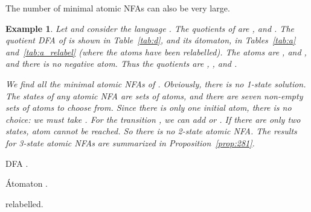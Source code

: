 \documentclass[preprint,12pt]{elsarticle}
\newcommand{\qedb}{\hfill}
\newtheorem{example}{Example}
\begin{document}
The number of minimal atomic NFAs can also be very large. 
\begin{example}
\label{ex:atomicminimal}
Let  and consider the language .
The quotients of  are ,  and .
The quotient DFA of  is shown in Table~\ref{tab:d}, and its \'atomaton, in Tables~\ref{tab:a} and~\ref{tab:a_relabel} (where the atoms have been relabelled). 
The atoms  are ,  and , and there is no negative atom.
Thus the quotients are , , and .

We find all the minimal atomic NFAs of .
Obviously, there is no 1-state solution.
The states of any atomic NFA are sets of atoms, and 
there are seven non-empty sets of atoms to choose from. 
Since there is only one initial atom, there is no choice: we must take .
For the transition , we can add  or . 
If there are only two states, atom  cannot be reached. So there is no  2-state atomic NFA.
The results for 3-state atomic NFAs  are summarized in Proposition~\ref{prop:281}. 
\qedb
\end{example}


\begin{table}[hbt]
\begin{minipage}[b]{0.2\linewidth}
\caption{DFA .}
\label{tab:d}
{\footnotesize
\begin{center}

\end{center}}
\end{minipage}
\hspace{1cm}
\begin{minipage}[b]{0.32\linewidth}
\caption{\'Atomaton .}
\label{tab:a}
{\footnotesize
\begin{center}

\end{center}}
\end{minipage}
\hspace{0.35cm}
\begin{minipage}[b]{0.35\linewidth}
\caption{ relabelled.}
\label{tab:a_relabel}
{\footnotesize
\begin{center}

\end{center}}
\end{minipage}
\end{table}
\end{document}
